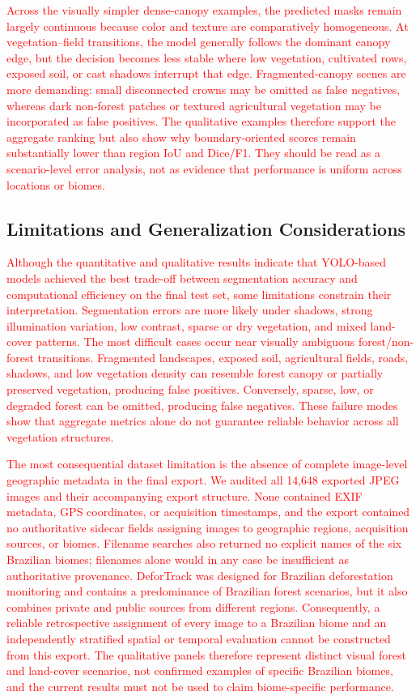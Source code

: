 \documentclass[journal,article,submit,pdftex,moreauthors]{Definitions/mdpi}
\begin{document}
\textcolor{red}{Across the visually simpler dense-canopy examples, the predicted masks remain largely continuous because color and texture are comparatively homogeneous. At vegetation--field transitions, the model generally follows the dominant canopy edge, but the decision becomes less stable where low vegetation, cultivated rows, exposed soil, or cast shadows interrupt that edge. Fragmented-canopy scenes are more demanding: small disconnected crowns may be omitted as false negatives, whereas dark non-forest patches or textured agricultural vegetation may be incorporated as false positives. The qualitative examples therefore support the aggregate ranking but also show why boundary-oriented scores remain substantially lower than region IoU and Dice/F1. They should be read as a scenario-level error analysis, not as evidence that performance is uniform across locations or biomes.}

\subsection{Limitations and Generalization Considerations}
\label{sec:limitations}

\textcolor{red}{Although the quantitative and qualitative results indicate that YOLO-based models achieved the best trade-off between segmentation accuracy and computational efficiency on the final test set, some limitations constrain their interpretation. Segmentation errors are more likely under shadows, strong illumination variation, low contrast, sparse or dry vegetation, and mixed land-cover patterns. The most difficult cases occur near visually ambiguous forest/non-forest transitions. Fragmented landscapes, exposed soil, agricultural fields, roads, shadows, and low vegetation density can resemble forest canopy or partially preserved vegetation, producing false positives. Conversely, sparse, low, or degraded forest can be omitted, producing false negatives. These failure modes show that aggregate metrics alone do not guarantee reliable behavior across all vegetation structures.}

\textcolor{red}{The most consequential dataset limitation is the absence of complete image-level geographic metadata in the final export. We audited all 14,648 exported JPEG images and their accompanying export structure. None contained EXIF metadata, GPS coordinates, or acquisition timestamps, and the export contained no authoritative sidecar fields assigning images to geographic regions, acquisition sources, or biomes. Filename searches also returned no explicit names of the six Brazilian biomes; filenames alone would in any case be insufficient as authoritative provenance. DeforTrack was designed for Brazilian deforestation monitoring and contains a predominance of Brazilian forest scenarios, but it also combines private and public sources from different regions. Consequently, a reliable retrospective assignment of every image to a Brazilian biome and an independently stratified spatial or temporal evaluation cannot be constructed from this export. The qualitative panels therefore represent distinct visual forest and land-cover scenarios, not confirmed examples of specific Brazilian biomes, and the current results must not be used to claim biome-specific performance.}
\end{document}
